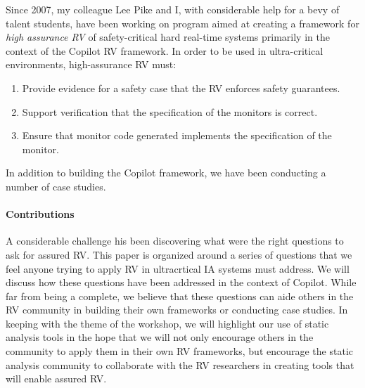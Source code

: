Since 2007, my colleague Lee Pike and I, with considerable help for a
bevy of talent students, have been working on program aimed at
creating a framework for \emph{high assurance RV} of safety-critical
hard real-time systems primarily in the context of the Copilot RV
framework.  In order to be used in ultra-critical environments,
high-assurance RV must:
\begin{enumerate}
\item \label{req:a} Provide evidence for a safety case that the RV enforces safety guarantees.
\item \label{req:b} Support verification that the specification of the monitors
  is correct.
\item \label{req:c} Ensure that monitor code generated implements the specification of the
monitor.
\end{enumerate} 
In addition to building the Copilot framework, we have
been conducting a number of case studies.


\paragraph{Contributions} 
A considerable challenge his been discovering what were the right
questions to ask for assured RV.  This  paper is organized around a
series of questions that we feel anyone trying to apply RV in
ultracrtical IA systems must address. We will discuss how these
questions have been addressed in the context of Copilot. While far
from being a complete, we  believe
that these questions can aide others in the RV community in building
their own frameworks or conducting case studies. In keeping with the
theme of the workshop, we will highlight our use of static analysis
tools in the hope that we will not only encourage others in the
community to apply them in their own RV frameworks, but encourage the
static analysis community to collaborate with the RV researchers in
creating tools that will enable assured RV.

 






 

